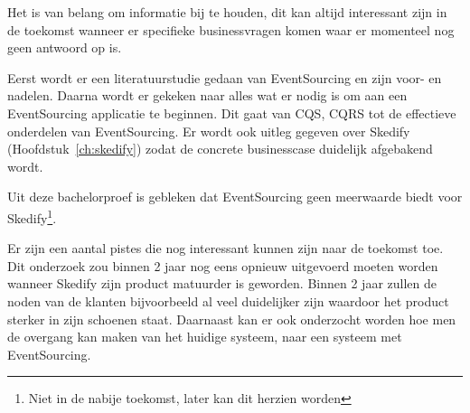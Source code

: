 Het is van belang om informatie bij te houden, dit kan altijd interessant zijn in de toekomst wanneer er specifieke businessvragen komen waar er momenteel nog geen antwoord op is.

Eerst wordt er een literatuurstudie gedaan van EventSourcing en zijn voor- en nadelen.
Daarna wordt er gekeken naar alles wat er nodig is om aan een EventSourcing applicatie te beginnen. Dit gaat van \gls{CQS}, \gls{CQRS} tot de effectieve onderdelen van EventSourcing. Er wordt ook uitleg gegeven over Skedify (Hoofdstuk~\ref{ch:skedify}) zodat de concrete businesscase duidelijk afgebakend wordt.

Uit deze bachelorproef is gebleken dat EventSourcing geen meerwaarde biedt voor Skedify\footnote{Niet in de nabije toekomst, later kan dit herzien worden}.

Er zijn een aantal pistes die nog interessant kunnen zijn naar de toekomst toe. Dit onderzoek zou binnen 2 jaar nog eens opnieuw uitgevoerd moeten worden wanneer Skedify zijn product matuurder is geworden. Binnen 2 jaar zullen de noden van de klanten bijvoorbeeld al veel duidelijker zijn waardoor het product sterker in zijn schoenen staat. Daarnaast kan er ook onderzocht worden hoe men de overgang kan maken van het huidige systeem, naar een systeem met EventSourcing.